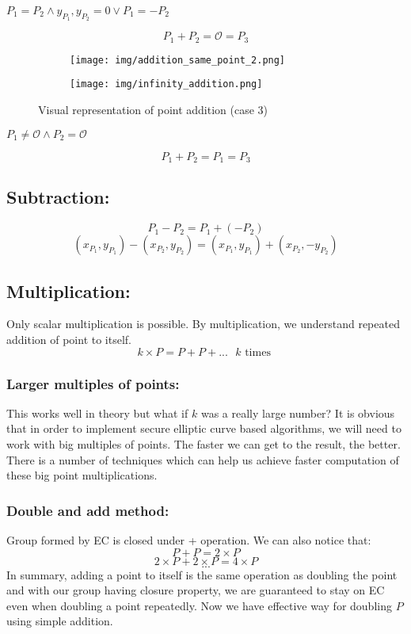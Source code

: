 \documentclass[bp,en]{FEIstyle}
\newcommand{\ycor}[1]{
y_{P_{#1}}
}
\begin{document}
 $P_1 = P_2 \wedge \ycor{1},\ycor{2} = 0 \vee P_1 = -P_2$  \par
\[
P_1 + P_2 = \mathcal{O} = P_3
\]
\begin{figure}[ht]
    \centering
    \begin{subfigure}{0.4\textwidth}
        \texttt{[image: img/addition\_same\_point\_2.png]}
        \label{fig:addition_curve_5}
    \end{subfigure}%
    \begin{subfigure}{0.405\textwidth} 
        \texttt{[image: img/infinity\_addition.png]}
        \label{fig:addition_curve_6}
    \end{subfigure}%
    \caption{Visual representation of point addition (case 3)}
    \label{fig:addition_elliptic_curves_3}
\end{figure}
 $P_1 \neq \mathcal{O} \wedge P_2 = \mathcal{O}$  \par
\[
P_1 + P_2 = P_1 = P_3
\]

\subsection*{Subtraction:}
\[
P_1 - P_2 = P_1 + (-P_2)
\]
\[ 
(x_{P_1}, y_{P_1}) - (x_{P_2}, y_{P_2}) = (x_{P_1}, y_{P_1}) + (x_{P_2}, -y_{P_2})
\]
\subsection*{Multiplication:}
Only scalar multiplication is possible. By multiplication, we understand repeated addition of point to itself.
\[
k\times P = P + P + ... \text{ } k \text{ times }
\] 
\subsubsection*{Larger multiples of points:}
This works well in theory but what if $k$ was a really large number? It is obvious that in order to implement secure elliptic curve based algorithms, we will need to work with big multiples of points. The faster we can get to the result, the better. There is a number of techniques which can help us achieve faster computation of these big point multiplications.


\subsubsection*{Double and add method:}
Group formed by EC is closed under + operation. We can also notice that: 
\[
    P+P=2\times P
\]
\[
    2\times P+2\times P=4\times P
\]
\[
    ...
\]
In summary, adding a point to itself is the same operation as doubling the point and with our group having closure property, we are guaranteed to stay on EC even when doubling a point repeatedly. Now we have effective way for doubling $P$ using simple addition. 
\end{document}
